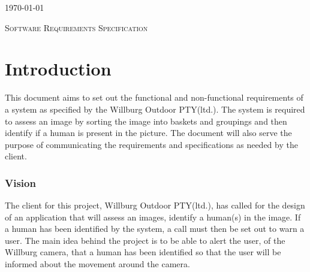 \documentclass[a4paper,12pt]{report}
\begin{document}
\begin{titlepage}
\begin{center}
{\large \today}
\end{center}
\end{titlepage}
\footnotesize
\normalsize

\renewcommand{\thesection}{\arabic{section}}
\newpage
\begin{center}
\textsc{\LARGE Software Requirements Specification}\\[1.5cm]
\end{center}



\section{Introduction}
This document aims to set out the functional and non-functional requirements of a system as specified by the Willburg Outdoor PTY(ltd.). The system is required to assess an image by sorting the image into baskets and groupings and then identify if a human is present in the picture. The document will also serve the purpose of communicating the requirements and specifications as needed by the client.

 \subsubsection{Vision}
 The client for this project, Willburg Outdoor PTY(ltd.), has called for the design of an application that will assess an images, identify a human(s) in the image. If a human has been identified by the system, a call must then be set out to warn a user. The main idea behind the project is to be able to alert the user, of the Willburg camera, that a human has been identified so that the user will be informed about the movement around the camera.
\end{document}
